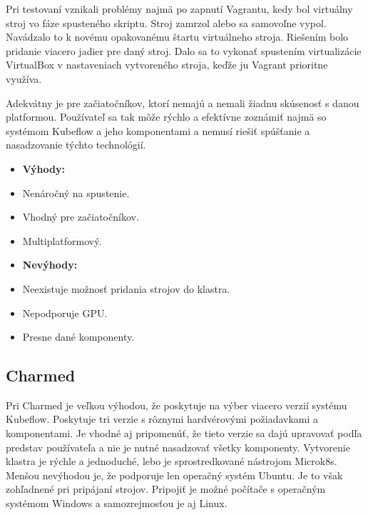 Pri testovaní vznikali problémy najmä po zapnutí Vagrantu, kedy bol virtuálny stroj vo fáze spusteného skriptu. Stroj zamrzol alebo sa samovoľne vypol. Navádzalo to k novému opakovanému štartu virtuálneho stroja. Riešením bolo pridanie viacero jadier pre daný stroj. Dalo sa to vykonať spustením virtualizácie VirtualBox v nastaveniach vytvoreného stroja, keďže ju Vagrant prioritne využíva.

Adekvátny je pre začiatočníkov, ktorí nemajú a nemali žiadnu skúsenosť s danou platformou. Používateľ sa tak môže rýchlo a efektívne zoznámiť najmä so systémom Kubeflow a jeho komponentami a nemusí riešiť spúšťanie a nasadzovanie týchto technológií.
\newline
\newline
\begin{minipage}[t]{.45\textwidth}
    \begin{itemize}
        \item []\textbf{Výhody:}
        \item Nenáročný na spustenie.
	    \item Vhodný pre začiatočníkov.
        \item Multiplatformový.
    \end{itemize}
\end{minipage}%
\begin{minipage}[t]{.55\textwidth}
    \begin{itemize}
        \item []\textbf{Nevýhody:}
        \item Neexistuje možnosť pridania strojov do klastra.
	\item Nepodporuje GPU.
    \item Presne dané komponenty.
    \end{itemize}
\end{minipage}

\subsection*{Charmed}

Pri Charmed je veľkou výhodou, že poskytuje na výber viacero verzií systému Kubeflow. Poskytuje tri verzie s rôznymi hardvérovými požiadavkami a komponentami. Je vhodné aj pripomenúť, že tieto verzie sa dajú upravovať podľa predstav používateľa a nie je nutné nasadzovať všetky komponenty. Vytvorenie klastra je rýchle a jednoduché, lebo je sprostredkované nástrojom Microk8s. Menšou nevýhodou je, že podporuje len operačný systém Ubuntu. Je to však zohľadnené pri pripájaní strojov. Pripojiť je možné počítače s operačným systémom Windows a samozrejmosťou je aj Linux.

